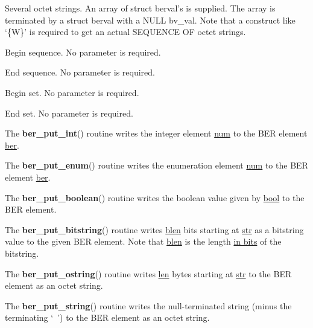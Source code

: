 \documentclass[]{article}
\let\realtextbf=\textbf
\renewcommand{\textbf}[1]{\textcolor{boldcolor}{\realtextbf{#1}}}
\renewcommand{\emph}[1]{\underline{#1}}
\begin{document}
\begin{description}
\itemsep1pt\parskip0pt
\item[\textbf{W}]
Several octet strings. An array of struct berval's is supplied. The
array is terminated by a struct berval with a NULL bv\_val. Note that a
construct like `\{W\}' is required to get an actual SEQUENCE OF octet
strings.
\end{description}

\begin{description}
\itemsep1pt\parskip0pt
\item[\textbf{\{}]
Begin sequence. No parameter is required.
\end{description}

\begin{description}
\itemsep1pt\parskip0pt
\item[\textbf{\}}]
End sequence. No parameter is required.
\end{description}

\begin{description}
\itemsep1pt\parskip0pt
\item[\textbf{{[}}]
Begin set. No parameter is required.
\end{description}

\begin{description}
\itemsep1pt\parskip0pt
\item[\textbf{{]}}]
End set. No parameter is required.
\end{description}

The \textbf{ber\_put\_int}() routine writes the integer element
\emph{num} to the BER element \emph{ber}.

The \textbf{ber\_put\_enum}() routine writes the enumeration element
\emph{num} to the BER element \emph{ber}.

The \textbf{ber\_put\_boolean}() routine writes the boolean value given
by \emph{bool} to the BER element.

The \textbf{ber\_put\_bitstring}() routine writes \emph{blen} bits
starting at \emph{str} as a bitstring value to the given BER element.
Note that \emph{blen} is the length \emph{in bits} of the bitstring.

The \textbf{ber\_put\_ostring}() routine writes \emph{len} bytes
starting at \emph{str} to the BER element as an octet string.

The \textbf{ber\_put\_string}() routine writes the null-terminated
string (minus the terminating ` ') to the BER element as an octet
string.
\end{document}
